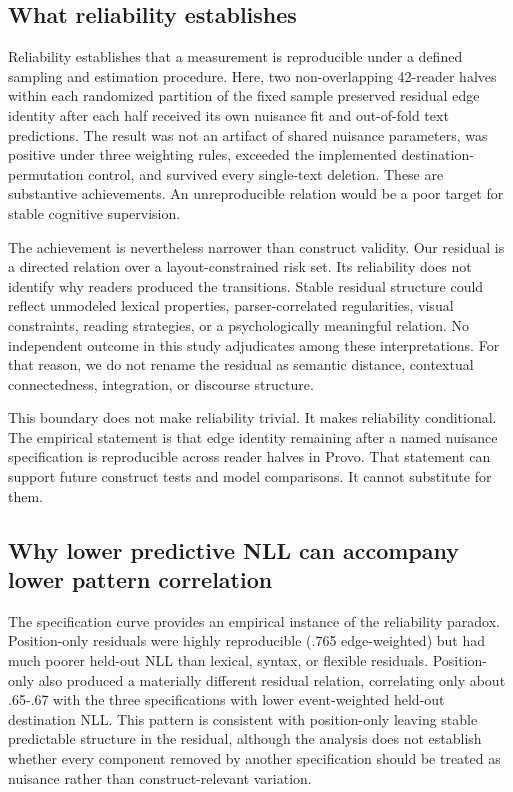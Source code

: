 \documentclass[11pt]{article}
\begin{document}
\subsection{What reliability establishes}

Reliability establishes that a measurement is reproducible under a defined sampling and estimation procedure. Here, two non-overlapping 42-reader halves within each randomized partition of the fixed sample preserved residual edge identity after each half received its own nuisance fit and out-of-fold text predictions. The result was not an artifact of shared nuisance parameters, was positive under three weighting rules, exceeded the implemented destination-permutation control, and survived every single-text deletion. These are substantive achievements. An unreproducible relation would be a poor target for stable cognitive supervision.

The achievement is nevertheless narrower than construct validity. Our residual is a directed relation over a layout-constrained risk set. Its reliability does not identify why readers produced the transitions. Stable residual structure could reflect unmodeled lexical properties, parser-correlated regularities, visual constraints, reading strategies, or a psychologically meaningful relation. No independent outcome in this study adjudicates among these interpretations. For that reason, we do not rename the residual as semantic distance, contextual connectedness, integration, or discourse structure.

This boundary does not make reliability trivial. It makes reliability conditional. The empirical statement is that edge identity remaining after a named nuisance specification is reproducible across reader halves in Provo. That statement can support future construct tests and model comparisons. It cannot substitute for them.

\subsection{Why lower predictive NLL can accompany lower pattern correlation}

The specification curve provides an empirical instance of the reliability paradox. Position-only residuals were highly reproducible (.765 edge-weighted) but had much poorer held-out NLL than lexical, syntax, or flexible residuals. Position-only also produced a materially different residual relation, correlating only about .65-.67 with the three specifications with lower event-weighted held-out destination NLL. This pattern is consistent with position-only leaving stable predictable structure in the residual, although the analysis does not establish whether every component removed by another specification should be treated as nuisance rather than construct-relevant variation.
\end{document}
